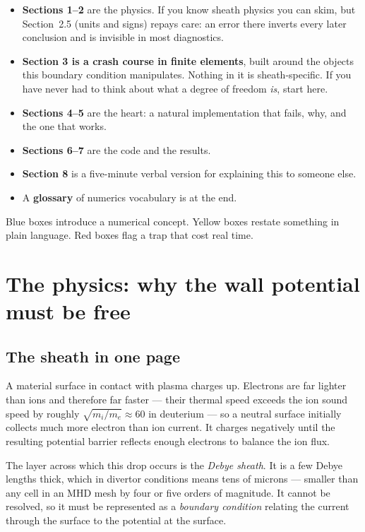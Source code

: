 \documentclass[11pt,a4paper]{article}
\begin{document}
\begin{itemize}\itemsep3pt
\item \textbf{Sections 1--2} are the physics. If you know sheath physics you can skim, but
  Section~2.5 (units and signs) repays care: an error there inverts every later conclusion and is
  invisible in most diagnostics.
\item \textbf{Section 3 is a crash course in finite elements}, built around the objects this
  boundary condition manipulates. Nothing in it is sheath-specific. If you have never had to think
  about what a degree of freedom \emph{is}, start here.
\item \textbf{Sections 4--5} are the heart: a natural implementation that fails, why, and the one
  that works.
\item \textbf{Sections 6--7} are the code and the results.
\item \textbf{Section 8} is a five-minute verbal version for explaining this to someone else.
\item A \textbf{glossary} of numerics vocabulary is at the end.
\end{itemize}

Blue boxes introduce a numerical concept. Yellow boxes restate something in plain language. Red
boxes flag a trap that cost real time.

\section{The physics: why the wall potential must be free}

\subsection{The sheath in one page}

A material surface in contact with plasma charges up. Electrons are far lighter than ions and
therefore far faster --- their thermal speed exceeds the ion sound speed by roughly
$\sqrt{m_i/m_e}\approx60$ in deuterium --- so a neutral surface initially collects much more
electron than ion current. It charges negatively until the resulting potential barrier reflects
enough electrons to balance the ion flux.

The layer across which this drop occurs is the \emph{Debye sheath}. It is a few Debye lengths thick,
which in divertor conditions means tens of microns --- smaller than any cell in an MHD mesh by four
or five orders of magnitude. It cannot be resolved, so it must be represented as a \emph{boundary
condition} relating the current through the surface to the potential at the surface.
\end{document}
